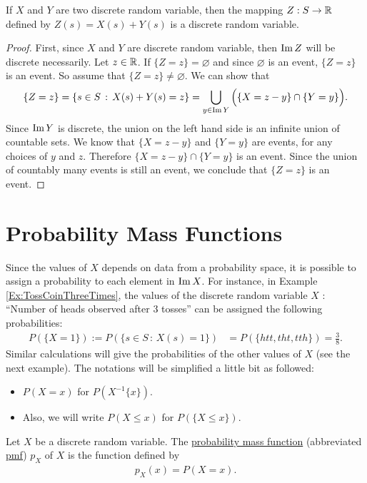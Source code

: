 \begin{theorem}
If $X$ and $Y$ are two discrete random variable, then the mapping $Z : S \rightarrow \mathbb{R}$ defined by $Z(s) = X(s) + Y (s)$ is a discrete random variable.
\end{theorem}
\begin{proof}
First, since $X$ and $Y$ are discrete random variable, then $\operatorname{Im} Z$ will be discrete necessarily. Let $z \in \mathbb{R}$. If $\{ Z = z \} = \varnothing$ and since $\varnothing$ is an event, $\{ Z = z \}$ is an event. So assume that $\{ Z = z \} \neq \varnothing$. We can show that 
    $$
    \{ Z = z \} = \{ s \in S \, : \, X(s) + Y(s) = z\} = \bigcup_{y \in \operatorname{Im} Y } \Big( \{ X = z - y \} \cap \{ Y = y \} \Big) .
    $$
Since $\operatorname{Im} Y$ is discrete, the union on the left hand side is an infinite union of countable sets. We know that $\{ X = z - y \}$ and $\{ Y = y \}$ are events, for any choices of $y$ and $z$. Therefore $\{ X = z - y \} \cap \{ Y = y \}$ is an event. Since the union of countably many events is still an event, we conclude that $\{ Z = z \}$ is an event.
\end{proof}

\section{Probability Mass Functions}
Since the values of $X$ depends on data from a probability space, it is possible to assign a probability to each element in $\operatorname{Im} X$. For instance, in Example \ref{Ex:TossCoinThreeTimes}, the values of the discrete random variable $X$ : ``Number of heads observed after $3$ tosses'' can be assigned the following probabilities:
    \begin{align*}
    P (\{X = 1\}) := P (\{ s \in S \, : \, X(s) = 1 \}) &= P (\{ htt, tht, tth\}) = \frac{3}{8} .
    \end{align*}
Similar calculations will give the probabilities of the other values of $X$ (see the next example). The notations will be simplified a little bit as followed:
    \begin{itemize}
        \item $P (X = x)$ for $P (X^{-1} \{ x \})$.
        \item Also, we will write $P (X \leq x)$ for $P (\{ X \leq x \})$.
    \end{itemize}



\begin{definition}
Let $X$ be a discrete random variable. The \underline{probability mass function} (abbreviated \underline{pmf}) $p_X$ of $X$ is the function defined by
    \begin{align*}
    p_X (x) = P ( X = x) .
    \end{align*} 
\end{definition}


